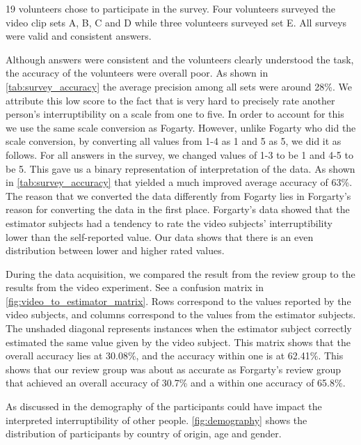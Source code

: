\documentclass{sigchi}
\begin{document}
19 volunteers chose to participate in the survey.
Four volunteers surveyed the video clip sets A, B, C and D while three volunteers surveyed set E.
All surveys were valid and consistent answers.

Although answers were consistent and the volunteers clearly understood the task, the accuracy of the volunteers were overall poor.
As shown in \autoref{tab:survey_accuracy} the average precision among all sets were around 28\%.
We attribute this low score to the fact that is very hard to precisely rate another person's interruptibility on a scale from one to five.
In order to account for this we use the same scale conversion as Fogarty\cite{fogarty2005predicting}.
However, unlike Fogarty who did the scale conversion, by converting all values from 1-4 as 1 and 5 as 5, we did it as follows. For all answers in the survey, we changed values of 1-3 to be 1 and 4-5 to be 5.
This gave us a binary representation of interpretation of the data.
As shown in \autoref{tab:survey_accuracy} that yielded a much improved average accuracy of 63\%.
The reason that we converted the data differently from Fogarty lies in Forgarty's reason for converting the data in the first place.
Forgarty's data showed that the estimator subjects had a tendency to rate the video subjects' interruptibility lower than the self-reported value.
Our data shows that there is an even distribution between lower and higher rated values.

During the data acquisition, we compared the result from the review group to the results from the video experiment.
See a confusion matrix in \autoref{fig:video_to_estimator_matrix}.
Rows correspond to the values reported by the video subjects, and columns correspond to the values from the estimator subjects.
The unshaded diagonal represents instances when the estimator subject correctly estimated the same value given by the video subject.
This matrix shows that the overall accuracy lies at 30.08\%, and the accuracy within one is at 62.41\%.
This shows that our review group was about as accurate as Forgarty's review group \cite{fogarty2005predicting} that achieved an overall accuracy of 30.7\% and a within one accuracy of 65.8\%.

As discussed in  the demography of the participants could have impact the interpreted interruptibility of other people.
\autoref{fig:demography} shows the distribution of participants by country of origin, age and gender.
\end{document}
